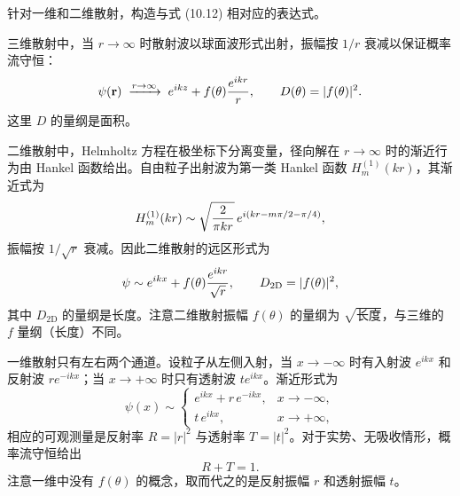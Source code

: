 \begin{question}
针对一维和二维散射，构造与式 (10.12) 相对应的表达式。

\par\smallskip
{}

\end{question}
\begin{solution}
三维散射中，当 $r\to\infty$ 时散射波以球面波形式出射，振幅按 $1/r$ 衰减以保证概率流守恒：
\[
\psi(\mathbf r)\;\xrightarrow{r\to\infty}\; e^{ikz}+f(\theta){e^{ikr}\over r},
\qquad
D(\theta)=|f(\theta)|^2.
\]
这里 $D$ 的量纲是面积。

二维散射中，Helmholtz 方程在极坐标下分离变量，径向解在 $r\to\infty$ 时的渐近行为由 Hankel 函数给出。自由粒子出射波为第一类 Hankel 函数 $H_m^{(1)}(kr)$，其渐近式为
\[
H_m^{(1)}(kr)\sim\sqrt{2\over\pi kr}\,e^{i(kr-m\pi/2-\pi/4)},
\]
振幅按 $1/\sqrt{r}$ 衰减。因此二维散射的远区形式为
\[
\psi\sim e^{ikx}+f(\theta){e^{ikr}\over\sqrt r},
\qquad
D_{\text{2D}}=|f(\theta)|^2,
\]
其中 $D_{\text{2D}}$ 的量纲是长度。注意二维散射振幅 $f(\theta)$ 的量纲为 $\sqrt{\text{长度}}$，与三维的 $f$ 量纲（长度）不同。

一维散射只有左右两个通道。设粒子从左侧入射，当 $x\to-\infty$ 时有入射波 $e^{ikx}$ 和反射波 $re^{-ikx}$；当 $x\to+\infty$ 时只有透射波 $te^{ikx}$。渐近形式为
\[
\psi(x)\sim\begin{cases}
e^{ikx}+r\,e^{-ikx}, & x\to-\infty,\\[4pt]
t\,e^{ikx}, & x\to+\infty,
\end{cases}
\]
相应的可观测量是反射率 $R=|r|^2$ 与透射率 $T=|t|^2$。对于实势、无吸收情形，概率流守恒给出
\[
\boxed{R+T=1.}
\]
注意一维中没有 $f(\theta)$ 的概念，取而代之的是反射振幅 $r$ 和透射振幅 $t$。
\end{solution}

